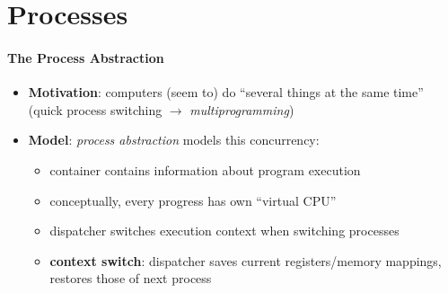 \section{Processes}

\paragraph{The Process Abstraction}
\begin{itemize}
	\item \textbf{Motivation}: computers (seem to) do ``several things at the same time'' (quick process switching $ \to $ \emph{multiprogramming})
	\item \textbf{Model}: \emph{process abstraction} models this concurrency:
	\begin{itemize}
		\item container contains information about program execution
		\item conceptually, every progress has own "`virtual CPU"'
		\item dispatcher switches execution context when switching processes
		\item \textbf{context switch}: dispatcher saves current registers/memory mappings, restores those of next process
	\end{itemize}
\end{itemize}

